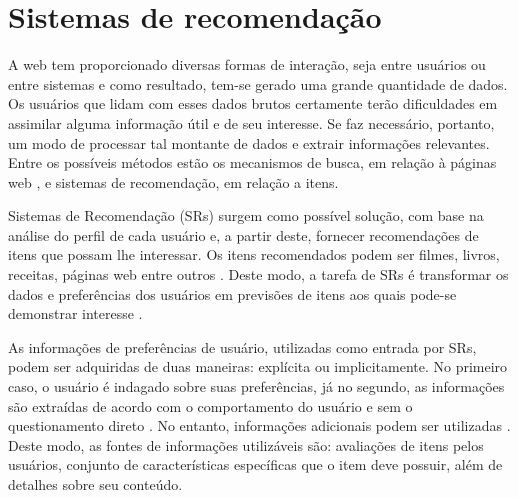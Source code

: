 \chapter{Sistemas de recomendação}
\label{cap:sistemas_de_recomendacao}



A web tem proporcionado diversas formas de interação, seja entre usuários ou entre sistemas e como resultado, tem-se gerado uma grande quantidade de dados. Os usuários que lidam com esses dados brutos certamente terão dificuldades em assimilar alguma informação útil e de seu interesse. Se faz necessário, portanto, um modo de processar tal montante de dados e extrair informações relevantes. Entre os possíveis métodos estão os mecanismos de busca, em relação à páginas web \cite{Brin1998}, e sistemas de recomendação, em relação a itens.


Sistemas de Recomendação (SRs) surgem como possível solução, com base na análise do perfil de cada usuário e, a partir deste, fornecer recomendações de itens que possam lhe interessar. Os itens recomendados podem ser filmes, livros, receitas, páginas web entre outros \cite{Bobadilla_2013}.  Deste modo, a tarefa de SRs é transformar os dados e preferências dos usuários em previsões de itens aos quais pode-se demonstrar interesse \cite{Lue2012}.



As informações de preferências de usuário, utilizadas como entrada por SRs, podem ser adquiridas de duas maneiras: explícita ou implicitamente. No primeiro caso, o usuário é indagado sobre suas preferências, já no segundo, as informações são extraídas de acordo com o comportamento do usuário e sem o questionamento direto \cite{Bobadilla_2013}. No entanto, informações adicionais podem ser utilizadas \cite{Jannach2010}. Deste modo, as fontes de informações utilizáveis são: avaliações de itens pelos usuários, conjunto de características específicas que o item deve possuir, além de detalhes sobre seu conteúdo. 

